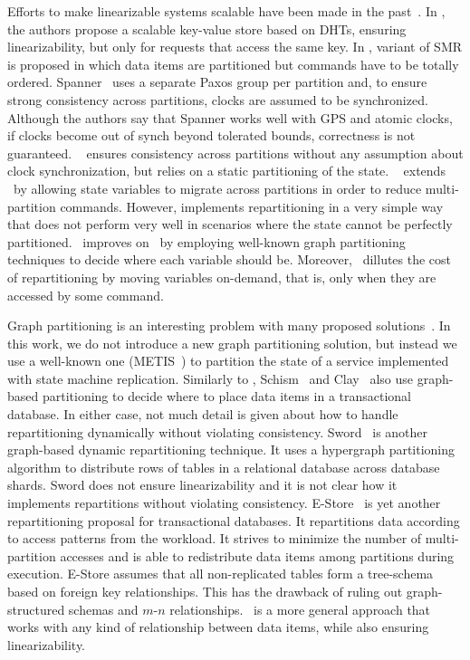 Efforts to make linearizable systems scalable have been made in the past~\cite{bezerra2014ssmr, corbett2013spanner, Glendenning2011, hoang2016, Marandi:2011dj}.
In \cite{Glendenning2011}, the authors propose a scalable key-value store based on DHTs, ensuring linearizability, but only for requests that access the same key. 
In \cite{Marandi:2011dj}, variant of SMR is proposed in which data items are partitioned but commands have to be totally ordered.
Spanner~\cite{corbett2013spanner} uses a separate Paxos group per partition and, to ensure strong consistency across partitions, clocks are assumed to be synchronized.
Although the authors say that Spanner works well with GPS and atomic clocks, if clocks become out of synch beyond tolerated bounds, correctness is not guaranteed.
\ssmr{}~\cite{bezerra2014ssmr} ensures consistency across partitions without any assumption about clock synchronization, but relies on a static partitioning of the state.
\dssmr{}~\cite{hoang2016} extends \ssmr\ by allowing state variables to migrate across partitions in order to reduce multi-partition commands.
However, \dssmr{} implements repartitioning in a very simple way that does not perform very well in scenarios where the state cannot be perfectly partitioned.
\dynastar\ improves on \dssmr\ by employing well-known graph partitioning techniques to decide where each variable should be.
Moreover, \dynastar\ dillutes the cost of repartitioning by moving variables on-demand, that is, only when they are accessed by some command.

Graph partitioning is an interesting problem with many proposed solutions~\cite{Abou-Rjeili:2006,hendrickson2000graph,kernighan1970efficient,7004087}.
In this work, we do not introduce a new graph partitioning solution, but instead we use a well-known one (METIS~\cite{Abou-Rjeili:2006}) to partition the state of a service implemented with state machine replication.
Similarly to \dynastar{}, Schism~\cite{curino2010sch} and Clay~\cite{SerafiniTEPAS16} also use graph-based partitioning to decide where to place data items in a transactional database.
In either case, not much detail is given about how to handle repartitioning dynamically without violating consistency.
Sword~\cite{quamar2013sword} is another graph-based dynamic repartitioning technique.
It uses a hypergraph partitioning algorithm to distribute rows of tables in a relational database across database shards.
Sword does not ensure linearizability and it is not clear how it implements repartitions without violating consistency.
E-Store~\cite{taft2014est} is yet another repartitioning proposal for transactional databases.
It repartitions data according to access patterns from the workload.
It strives to minimize the number of multi-partition accesses and is able to redistribute data items among partitions during execution.
E-Store assumes that all non-replicated tables form a tree-schema based on foreign key relationships.
This has the drawback of ruling out graph-structured schemas and \mbox{$m$-$n$} relationships.
\dynastar\ is a more general approach that works with any kind of relationship between data items, while also ensuring linearizability.

